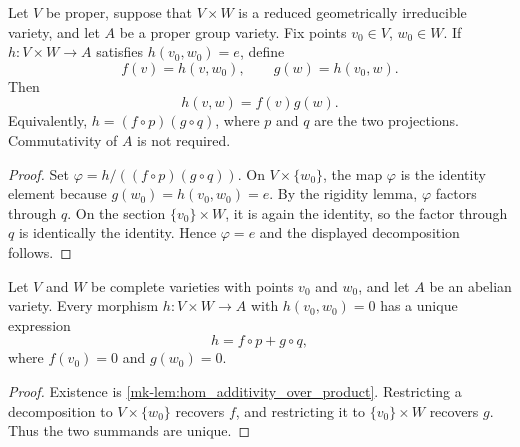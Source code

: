 \begin{lemma}
  \label{mk-lem:hom_additivity_over_product}
  \leanok

  Let \(V\) be proper, suppose that \(V\times W\) is a reduced geometrically
  irreducible variety, and let \(A\) be a proper group variety.  Fix points
  \(v_0\in V\), \(w_0\in W\).  If \(h\colon V\times W\to A\) satisfies
  \(h(v_0,w_0)=e\), define
  \[
    f(v)=h(v,w_0),\qquad g(w)=h(v_0,w).
  \]
  Then
  \[
    h(v,w)=f(v)g(w).
  \]
  Equivalently, \(h=(f\circ p)(g\circ q)\), where \(p\) and \(q\) are the two
  projections.  Commutativity of \(A\) is not required.
\end{lemma}
\begin{proof}
  \leanok
  Set \(\varphi=h/((f\circ p)(g\circ q))\).  On \(V\times\{w_0\}\), the map
  \(\varphi\) is the identity element because \(g(w_0)=h(v_0,w_0)=e\).  By the
  rigidity lemma, \(\varphi\) factors through \(q\).  On the section
  \(\{v_0\}\times W\), it is again the identity, so the factor through \(q\) is
  identically the identity.  Hence \(\varphi=e\) and the displayed decomposition
  follows.
\end{proof}

\begin{corollary}
  \label{mk-cor:hom_additivity_over_product_unique}
  Let \(V\) and \(W\) be complete varieties with points \(v_0\) and \(w_0\), and let
  \(A\) be an abelian variety.  Every morphism \(h\colon V\times W\to A\) with
  \(h(v_0,w_0)=0\) has a unique expression
  \[
    h=f\circ p+g\circ q,
  \]
  where \(f(v_0)=0\) and \(g(w_0)=0\).
\end{corollary}
\begin{proof}
  Existence is \ref{mk-lem:hom_additivity_over_product}.  Restricting a decomposition to
  \(V\times\{w_0\}\) recovers \(f\), and restricting it to
  \(\{v_0\}\times W\) recovers \(g\).  Thus the two summands are unique.
\end{proof}

